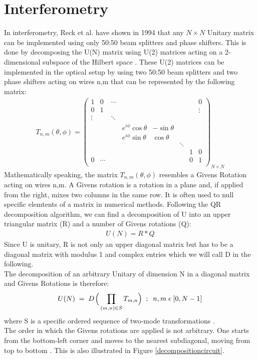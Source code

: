 \documentclass[12pt,twoside]{report}  %
\begin{document}
\section{Interferometry}
In interferometry, Reck et al. have shown in 1994 that any $N \times N$ Unitary matrix can be implemented using only 50:50 beam splitters and phase shifters. This is done by decomposing the U(N) matrix using U(2) matrices acting on a 2-dimensional subspace of the Hilbert space \cite{Reck1994}. These U(2) matrices can be implemented in the optical setup by using two 50:50 beam splitters and two phase shifters acting on wires n,m that can be represented by the following matrix:
\begin{align}
    T_{n,m}(\theta,\phi) = \begin{pmatrix}
1 &   0     & \cdots       &        &        &        &     & 0\\
0  & 1 &        &        &        &  & & \vdots    \\
\vdots &  &  \ddots      &        &        &   &    \\
  &    & & e^{i\phi}\cos\theta & -\sin\theta & & \\
  &    & & e^{i\phi}\sin\theta & \cos\theta \\
  &        &        &        &        & \ddots \\
    &        &        &        &        & &1 &0\\
0 &   \cdots &      &        &        &  &   0   &      1\\
\end{pmatrix}_{N\times N}
\end{align}
Mathematically speaking, the matrix $T_{n,m}(\theta,\phi)$ resembles a Givens Rotation acting on wires n,m. A Givens rotation is a rotation in a plane and, if applied from the right, mixes two columns in the same row. It is often used to null specific elemtents of a matrix in numerical methods. Following the QR decomposition algorithm, we can find a decomposition of U into an upper triangular matrix (R) and a number of Givens rotations (Q):
\begin{align}
    U(N) = R*Q
\end{align}
Since U is unitary, R is not only an upper diagonal matrix but has to be a diagonal matrix with modulus 1 and complex entries which we will call D in the following.\\
The decomposition of an arbitrary Unitary of dimension N in a diagonal matrix and Givens Rotations is therefore:
\begin{align}
    U(N) \;=\; D\;\!\Bigl(\,\prod_{(m,n)\in S} T_{m,n}\Bigr) \;\; ; \;\; n,m \;\epsilon \;[0, N-1]
    \label{Clementsdecomp}
\end{align}
where S is a specific ordered sequence of two-mode transformations \cite{Clements:16}.\\
The order in which the Givens rotations are applied is not arbitrary. One starts from the bottom-left corner and moves to the nearest subdiagonal, moving from top to bottom \cite{cilluffo2024}. This is also illustrated in Figure \ref{decompositioncircuit}. \\
\end{document}
